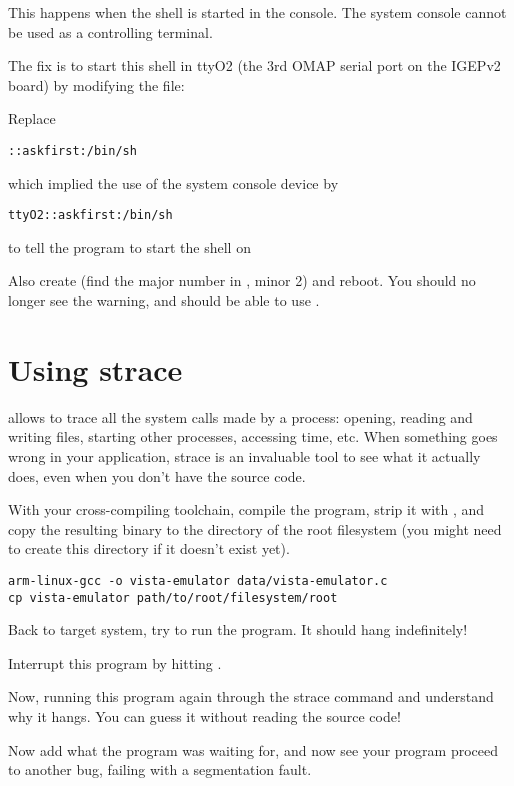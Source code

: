 This happens when the shell is started in the console. The system
console cannot be used as a controlling terminal.

The fix is to start this shell in ttyO2 (the 3rd OMAP serial port on
the IGEPv2 board) by modifying the  file:

Replace
\begin{verbatim}
::askfirst:/bin/sh
\end{verbatim}
which implied the use of the system console device by
\begin{verbatim}
ttyO2::askfirst:/bin/sh
\end{verbatim}
to tell the  program to start the shell on 

Also create  (find the major number in
, minor 2) and reboot. You should no longer see
the  warning, and should be able to use
\code{[Ctrl] [C]}.

\section{Using strace}

 allows to trace all the system calls made by a process:
opening, reading and writing files, starting other processes,
accessing time, etc. When something goes wrong in your application,
strace is an invaluable tool to see what it actually does, even when
you don't have the source code.

With your cross-compiling toolchain, compile the
 program, strip it with ,
and copy the resulting binary to
the  directory of the root filesystem (you might need to create
this directory if it doesn't exist yet).

\begin{verbatim}
arm-linux-gcc -o vista-emulator data/vista-emulator.c
cp vista-emulator path/to/root/filesystem/root
\end{verbatim}

Back to target system, try to run the 
program. It should hang indefinitely!

Interrupt this program by hitting \code{[Ctrl] [C]}.

Now, running this program again through the strace command and
understand why it hangs. You can guess it without reading the source
code!

Now add what the program was waiting for, and now see your program
proceed to another bug, failing with a segmentation fault.

